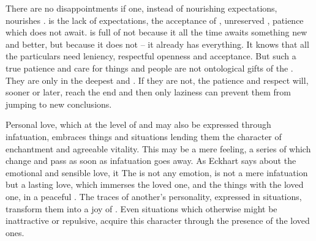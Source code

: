 There are no disappointments if one, instead of nourishing expectations,
nourishes .  is the lack of expectations, the acceptance of
, unreserved , patience which does not await. 
is full of  not because it all the time awaits something new and
better, but because it does not -- it already has everything. It knows that all
the particulars need leniency, respectful openness and acceptance.  But such a
true patience and care for things and people are not ontological gifts of the
. They are  only in the deepest  and
. If they are not, the patience and respect will, sooner or later,
reach the end and then only laziness can prevent them from jumping to new
conclusions.


\pa \act Personal love, which at the level of  and  may
also be expressed through infatuation, embraces things and situations lending
them the character of enchantment and agreeable vitality.  This may be a mere
feeling, a series of  which change and pass as soon as
infatuation goes away. As Eckhart says about the emotional and sensible love, it
 The 
is not any emotion, is not a mere infatuation but a lasting love, which immerses
the loved one, and the things  with the loved one, in a peaceful
.  The traces of another's personality, expressed in
 situations, transform them into a joy of . Even
situations which otherwise might be inattractive or repulsive,
acquire this character through the presence of the loved ones.

